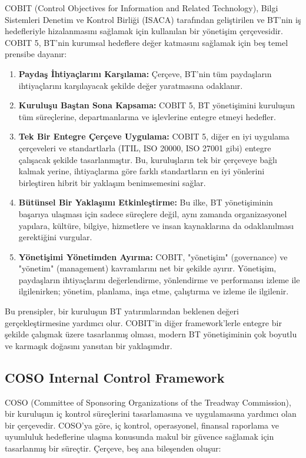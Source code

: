 COBIT (Control Objectives for Information and Related Technology), Bilgi Sistemleri Denetim ve Kontrol Birliği (ISACA) tarafından geliştirilen ve BT'nin iş hedefleriyle hizalanmasını sağlamak için kullanılan bir yönetişim çerçevesidir. COBIT 5, BT'nin kurumsal hedeflere değer katmasını sağlamak için beş temel prensibe dayanır:

\begin{enumerate}
    \item \textbf{Paydaş İhtiyaçlarını Karşılama:} Çerçeve, BT'nin tüm paydaşların ihtiyaçlarını karşılayacak şekilde değer yaratmasına odaklanır.
    \item \textbf{Kuruluşu Baştan Sona Kapsama:} COBIT 5, BT yönetişimini kuruluşun tüm süreçlerine, departmanlarına ve işlevlerine entegre etmeyi hedefler.
    \item \textbf{Tek Bir Entegre Çerçeve Uygulama:} COBIT 5, diğer en iyi uygulama çerçeveleri ve standartlarla (ITIL, ISO 20000, ISO 27001 gibi) entegre çalışacak şekilde tasarlanmıştır. Bu, kuruluşların tek bir çerçeveye bağlı kalmak yerine, ihtiyaçlarına göre farklı standartların en iyi yönlerini birleştiren hibrit bir yaklaşım benimsemesini sağlar.
    \item \textbf{Bütünsel Bir Yaklaşımı Etkinleştirme:} Bu ilke, BT yönetişiminin başarıya ulaşması için sadece süreçlere değil, aynı zamanda organizasyonel yapılara, kültüre, bilgiye, hizmetlere ve insan kaynaklarına da odaklanılması gerektiğini vurgular.
    \item \textbf{Yönetişimi Yönetimden Ayırma:} COBIT, "yönetişim" (governance) ve "yönetim" (management) kavramlarını net bir şekilde ayırır. Yönetişim, paydaşların ihtiyaçlarını değerlendirme, yönlendirme ve performansı izleme ile ilgilenirken; yönetim, planlama, inşa etme, çalıştırma ve izleme ile ilgilenir.
\end{enumerate}

Bu prensipler, bir kuruluşun BT yatırımlarından beklenen değeri gerçekleştirmesine yardımcı olur. COBIT'in diğer framework'lerle entegre bir şekilde çalışmak üzere tasarlanmış olması, modern BT yönetişiminin çok boyutlu ve karmaşık doğasını yansıtan bir yaklaşımdır.

\subsection{COSO Internal Control Framework}

COSO (Committee of Sponsoring Organizations of the Treadway Commission), bir kuruluşun iç kontrol süreçlerini tasarlamasına ve uygulamasına yardımcı olan bir çerçevedir. COSO'ya göre, iç kontrol, operasyonel, finansal raporlama ve uyumluluk hedeflerine ulaşma konusunda makul bir güvence sağlamak için tasarlanmış bir süreçtir. Çerçeve, beş ana bileşenden oluşur:

